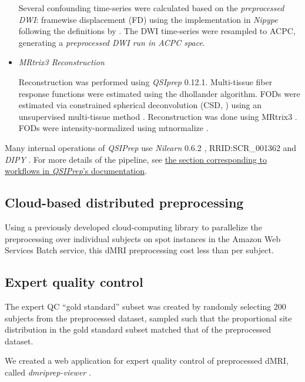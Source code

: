 \documentclass[fleqn,10pt]{wlscirep}
\begin{document}
\begin{itemize}
Several confounding time-series were calculated based on the
\emph{preprocessed DWI}: framewise displacement (FD) using the implementation
in \emph{Nipype} following the definitions by \cite{power_fd_dvars}. The DWI
time-series were resampled to ACPC, generating a \emph{preprocessed DWI run
in ACPC space}.

\item {\it MRtrix3 Reconstruction}

Reconstruction was performed using \emph{QSIprep} 0.12.1. Multi-tissue fiber
response functions were estimated using the dhollander algorithm. FODs were
estimated via constrained spherical deconvolution (CSD, \cite{originalcsd,
tournier2008csd}) using an unsupervised multi-tissue method
\cite{dhollander2019response, dhollander2016unsupervised}. Reconstruction was
done using MRtrix3 \cite{mrtrix3}. FODs were intensity-normalized using
mtnormalize \cite{mtnormalize}.

\end{itemize}

Many internal operations of \emph{QSIPrep} use \emph{Nilearn} 0.6.2
\cite{nilearn}, RRID:SCR\_001362 and \emph{DIPY} \cite{dipy}. For more details
of the pipeline, see
\href{https://qsiprep.readthedocs.io/en/latest/workflows.html}{the section
corresponding to workflows in \emph{QSIPrep}'s documentation}.

\subsection*{Cloud-based distributed preprocessing}

Using a previously developed cloud-computing library
\cite{richie-halford2018-kv} to parallelize the preprocessing over individual
subjects on spot instances in the Amazon Web Services Batch service, this dMRI
preprocessing cost less than  per subject.

\subsection*{Expert quality control}

The expert QC ``gold standard'' subset was created by randomly selecting 200
subjects from the preprocessed dataset, sampled such that the proportional site
distribution in the gold standard subset matched that of the preprocessed
dataset.

We created a web application for expert quality control of preprocessed dMRI,
called \emph{dmriprep-viewer} \cite{richie-halford2021-viewer}.
\end{document}
